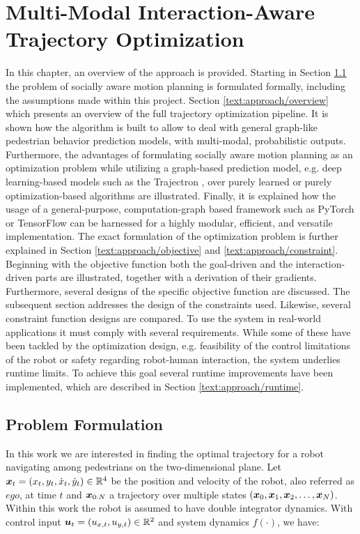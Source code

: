 \chapter{Multi-Modal Interaction-Aware Trajectory Optimization}
\label{text:approach}
In this chapter, an overview of the approach is provided. Starting in Section \ref{text:approach/formulation} the problem of socially aware motion planning is formulated formally, including the assumptions made within this project. 
\newline
Section \ref{text:approach/overview} which presents an overview of the full trajectory optimization pipeline. It is shown how the algorithm is built to allow to deal with general graph-like pedestrian behavior prediction models, with multi-modal, probabilistic outputs. Furthermore, the advantages of formulating socially aware motion planning as an optimization problem while utilizing a graph-based prediction model, e.g. deep learning-based models such as the Trajectron \cite{Ivanovic18}, over purely learned \cite{Chen2017} or purely optimization-based \cite{Berg2011} algorithms are illustrated. Finally, it is explained how the usage of a general-purpose, computation-graph based framework such as PyTorch \cite{pytorch} or TensorFlow \cite{tensorflow} can be harnessed for a highly modular, efficient, and versatile implementation.
\newline
The exact formulation of the optimization problem is further explained in Section \ref{text:approach/objective} and \ref{text:approach/constraint}. Beginning with the objective function both the goal-driven and the interaction-driven parts are illustrated, together with a derivation of their gradients. Furthermore, several designs of the specific objective function are discussed. The subsequent section addresses the design of the constraints used. Likewise, several constraint function designs are compared. 
\newline
To use the system in real-world applications it must comply with several requirements. While some of these have been tackled by the optimization design, e.g. feasibility of the control limitations of the robot or safety regarding robot-human interaction, the system underlies runtime limits. To achieve this goal several runtime improvements have been implemented, which are described in Section \ref{text:approach/runtime}.


\section{Problem Formulation}
\label{text:approach/formulation}
In this work we are interested in finding the optimal trajectory for a robot navigating among pedestrians on the two-dimensional plane. Let $\boldsymbol{x}_t = (x_t, y_t, \dot{x}_t, \dot{y}_t) \in \mathbb{R}^4 $ be the position and velocity of the robot, also referred as $ego$, at time $t$ and $\boldsymbol{x}_{0:N}$ a trajectory over multiple states $(\boldsymbol{x}_0, \boldsymbol{x}_1, \boldsymbol{x}_2, \hdots, \boldsymbol{x}_N)$. Within this work the robot is assumed to have double integrator dynamics. With control input $\boldsymbol{u}_t = (u_{x, t}, u_{y, t}) \in \mathbb{R}^2$ and system dynamics $f(\cdot)$, we have: 

